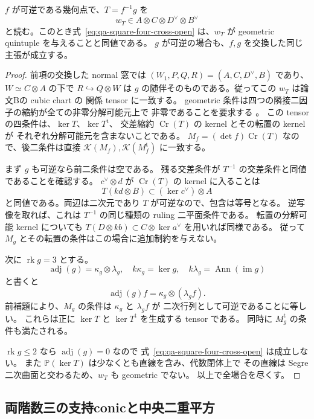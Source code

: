 \begin{lemma}[可逆な二積領域における四因子条件]
\label{lem:qa-cross-invertible-cubic}
$f$ が可逆である幾何点で、$T=f^{-1}g$ を
\[
 w_T\in A\otimes C\otimes D^\vee\otimes B^\vee
\]
と読む。このとき式~\eqref{eq:qa-square-four-cross-open} は、$w_T$ が
geometric quintuple を与えることと同値である。
$g$ が可逆の場合も、$f,g$ を交換した同じ主張が成立する。
\end{lemma}
\begin{proof}
前項の交換した normal 窓では
$(W_1,P,Q,R)=(A,C,D^\vee,B)$ であり、
$W\simeq C\otimes A$ の下で $R\hookrightarrow Q\otimes W$ は
$g$ の随伴そのものである。従ってこの $w_T$ は論文Bの cubic chart の
関係 tensor に一致する。
geometric 条件は四つの隣接二因子の縮約が全ての非零分解可能元上で
非零であることを要求する
\cite[Definition 5.3.1]{VdB2011}。
この tensor の四条件は、$\ker T$、$\ker T^{\mathrm t}$、
交差縮約 $\operatorname{Cr}(T)$ の kernel とその転置の kernel が
それぞれ分解可能元を含まないことである。
$M_f=(\det f)\operatorname{Cr}(T)$ なので、後二条件は直接
$\mathcal K(M_f),\mathcal K(M_f^{\mathrm t})$ に一致する。

まず $g$ も可逆なら前二条件は空である。
残る交差条件が $T^{-1}$ の交差条件と同値であることを確認する。
$c^\vee\otimes d$ が $\operatorname{Cr}(T)$ の kernel に入ることは
\[
 T(kd\otimes B)\subset(\ker c^\vee)\otimes A
\]
と同値である。両辺は二次元であり $T$ が可逆なので、包含は等号となる。
逆写像を取れば、これは $T^{-1}$ の同じ種類の ruling 二平面条件である。
転置の分解可能 kernel についても
$T(D\otimes kb)\subset C\otimes\ker a^\vee$ を用いれば同様である。
従って $M_g$ とその転置の条件はこの場合に追加制約を与えない。

次に $\operatorname{rk}g=3$ とする。
\[
 \operatorname{adj}(g)=\kappa_g\otimes\lambda_g,
 \quad k\kappa_g=\ker g,\quad
 k\lambda_g=\operatorname{Ann}(\operatorname{im}g)
\]
と書くと
\[
 \operatorname{adj}(g)f=\kappa_g\otimes(\lambda_gf).
\]
前補題により、$M_g$ の条件は $\kappa_g$ と $\lambda_gf$ が
二次行列として可逆であることに等しい。
これらは正に $\ker T$ と $\ker T^{\mathrm t}$ を生成する tensor である。
同時に $M_g^{\mathrm t}$ の条件も満たされる。

$\operatorname{rk}g\le2$ なら $\operatorname{adj}(g)=0$ なので
式~\eqref{eq:qa-square-four-cross-open} は成立しない。
また $\mathbb P(\ker T)$ は少なくとも直線を含み、代数閉体上で
その直線は Segre 二次曲面と交わるため、$w_T$ も geometric でない。
以上で全場合を尽くす。
\end{proof}

\subsection{両階数三の支持conicと中央二重平方}

